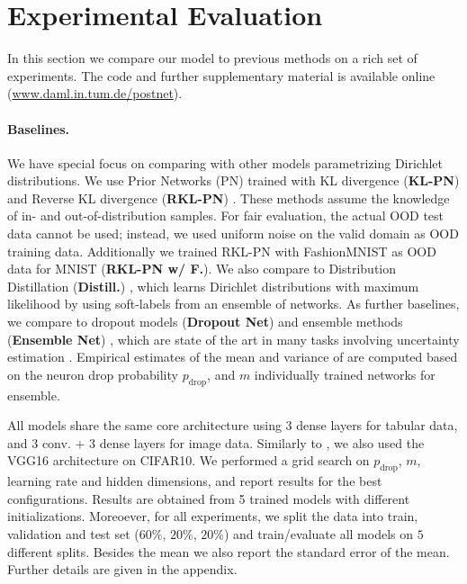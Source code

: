 \section{Experimental Evaluation}
\label{sec:experiments_006}

In this section we compare our model to previous methods on a rich set of experiments. The code and further supplementary material is available online (\url{www.daml.in.tum.de/postnet}).

\paragraph{Baselines.} We have special focus on comparing with other models parametrizing Dirichlet distributions. We use Prior Networks (PN) trained with KL divergence (\textbf{KL-PN}) \cite{prior_net} and Reverse KL divergence (\textbf{RKL-PN}) \cite{rev_kl_prior_net}. These methods assume the knowledge of in- and out-of-distribution samples. For fair evaluation, the actual OOD test data cannot be used; instead, we used uniform noise on the valid domain as OOD training data. Additionally we trained RKL-PN with FashionMNIST as OOD data for MNIST (\textbf{RKL-PN w/ F.}). We also compare to Distribution Distillation (\textbf{Distill.}) \cite{distribution_distillation}, which learns Dirichlet distributions with maximum likelihood by using soft-labels from an ensemble of networks. 
As further baselines, we compare to dropout models (\textbf{Dropout Net}) \cite{drop_out} and ensemble methods (\textbf{Ensemble Net}) \cite{ensemble_simple}, which are state of the art in many tasks involving uncertainty estimation \cite{uncertainty_survey}. Empirical estimates of the mean and variance of  are computed based on the neuron drop probability $p_{\text{drop}}$, and $m$ individually trained networks for ensemble.

All models share the same core architecture using 3 dense layers for tabular data, and 3 conv. + 3 dense layers for image data. Similarly to \cite{prior_net, rev_kl_prior_net}, we also used the VGG16 architecture \cite{vgg} on CIFAR10. We performed a grid search on $p_{\text{drop}}$, $m$, learning rate and hidden dimensions, and report results for the best configurations. Results are obtained from 5 trained models with different initializations.
Moreoever, for all experiments, we split the data into train, validation and test set  ($60\%$, $20\%$, $20\%$) and train/evaluate all models on $5$ different splits. Besides the mean we also report the standard error of the mean. Further details are given in the appendix.

